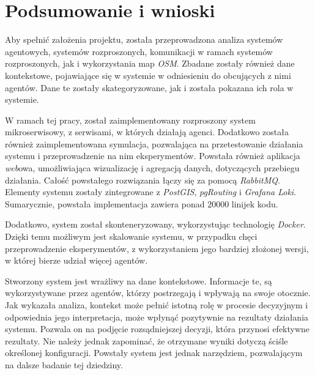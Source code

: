\chapter{Podsumowanie i wnioski}

\par Aby spełnić założenia projektu, została przeprowadzona analiza systemów agentowych, systemów rozproszonych, komunikacji w ramach systemów rozproszonych, jak i wykorzystania map \emph{OSM}. Zbadane zostały również dane kontekstowe, pojawiające się w systemie w odniesieniu do obcujących z nimi agentów. Dane te zostały skategoryzowane, jak i została pokazana ich rola w systemie.

\par W ramach tej pracy, został zaimplementowany rozproszony system mikroserwisowy, z serwisami, w których działają agenci. Dodatkowo została również zaimplementowana symulacja, pozwalająca na przetestowanie działania systemu i przeprowadzenie na nim eksperymentów. Powstała również aplikacja \emph{web}owa, umożliwiająca wizualizację i agregacją danych, dotyczących przebiegu działania. Całość powstałego rozwiązania łączy się za pomocą \emph{RabbitMQ}. Elementy systemu zostały zintegrowane z \emph{PostGIS}, \emph{pgRouting} i \emph{Grafana Loki}. Sumarycznie, powstała implementacja zawiera ponad $20000$ linijek kodu.

\par Dodatkowo, system został skonteneryzowany, wykorzystując technologię \emph{Docker}. Dzięki temu możliwym jest skalowanie systemu, w przypadku chęci przeprowadzenie eksperymentów, z wykorzystaniem jego bardziej złożonej wersji, w której bierze udział więcej agentów.

\par Stworzony system jest wrażliwy na dane kontekstowe. Informacje te, są wykorzystywane przez agentów, którzy postrzegają i wpływają na swoje otocznie. Jak wykazała analiza, kontekst może pełnić istotną rolę w procesie decyzyjnym i odpowiednia jego interpretacja, może wpłynąć pozytywnie na rezultaty działania systemu. Pozwala on na podjęcie rozsądniejszej decyzji, która przynosi efektywne rezultaty. Nie należy jednak zapominać, że otrzymane wyniki dotyczą ściśle określonej konfiguracji. Powstały system jest jednak narzędziem, pozwalającym na dalsze badanie tej dziedziny.